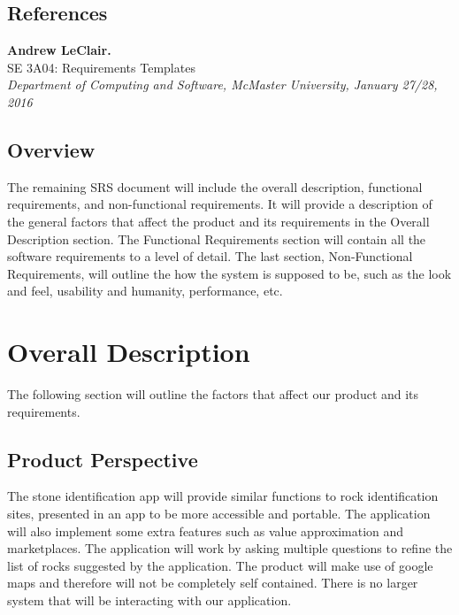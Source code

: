 \documentclass[titlepage]{article}
\begin{document}
\subsection{References}
\textbf{Andrew LeClair.}\\
SE 3A04: Requirements Templates\\
\textit{Department of Computing and Software, McMaster University, January 27/28, 2016}
\subsection{Overview}
The remaining SRS document will include the overall description, functional requirements, and non-functional requirements. It will provide a description of the general factors that affect the product and its requirements in the Overall Description section. The Functional Requirements section will contain all the software requirements to a level of detail. The last section, Non-Functional Requirements, will outline the how the system is supposed to be, such as the look and feel, usability and humanity, performance, etc. 


\section{Overall Description}
The following section will outline the factors that affect our product and its requirements.\\

\subsection{Product Perspective}
The stone identification app will provide similar functions to rock identification sites, presented in an app to be more accessible and portable. The application will also implement some extra features such as value approximation and marketplaces. The application will work by asking multiple questions to refine the list of rocks suggested by the application. The product will make use of google maps and therefore will not be completely self contained. 
There is no larger system that will be interacting with our application.\\
\end{document}
